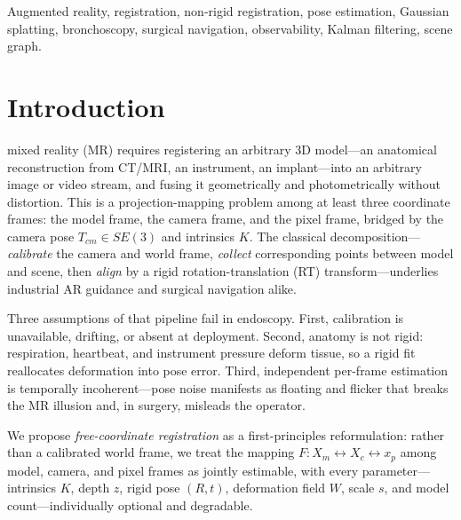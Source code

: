 \documentclass[journal]{IEEEtran}
\begin{document}
\begin{IEEEkeywords}
Augmented reality, registration, non-rigid registration, pose estimation, Gaussian splatting, bronchoscopy, surgical navigation, observability, Kalman filtering, scene graph.
\end{IEEEkeywords}

\section{Introduction}
 mixed reality (MR) requires registering an arbitrary 3D model---an anatomical reconstruction from CT/MRI, an instrument, an implant---into an arbitrary image or video stream, and fusing it geometrically and photometrically without distortion. This is a projection-mapping problem among at least three coordinate frames: the model frame, the camera frame, and the pixel frame, bridged by the camera pose $T_{cm}\in SE(3)$ and intrinsics $K$. The classical decomposition---\emph{calibrate} the camera and world frame, \emph{collect} corresponding points between model and scene, then \emph{align} by a rigid rotation-translation (RT) transform---underlies industrial AR guidance and surgical navigation alike.

Three assumptions of that pipeline fail in endoscopy. First, calibration is unavailable, drifting, or absent at deployment. Second, anatomy is not rigid: respiration, heartbeat, and instrument pressure deform tissue, so a rigid fit reallocates deformation into pose error. Third, independent per-frame estimation is temporally incoherent---pose noise manifests as floating and flicker that breaks the MR illusion and, in surgery, misleads the operator.

We propose \emph{free-coordinate registration} as a first-principles reformulation: rather than a calibrated world frame, we treat the mapping $F: X_m \leftrightarrow X_c \leftrightarrow x_p$ among model, camera, and pixel frames as jointly estimable, with every parameter---intrinsics $K$, depth $z$, rigid pose $(R,t)$, deformation field $W$, scale $s$, and model count---individually optional and degradable.
\end{document}

